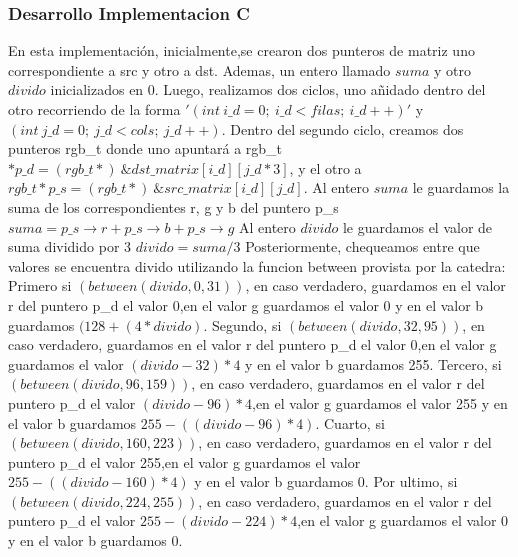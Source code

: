 \vspace*{0.3cm} \noindent
\subsubsection{Desarrollo Implementacion C}

En esta implementación, inicialmente,se crearon dos punteros de matriz uno correspondiente a src y otro a dst.\newline 
Ademas, un entero llamado $suma$ y otro $divido$ inicializados en 0. \newline
Luego, realizamos dos ciclos, uno añidado dentro del otro recorriendo de la forma $'(int\ i\_d = 0;\ i\_d < filas;\ i\_d++)'$ y 
$(int\ j\_d = 0;\ j\_d < cols;\ j\_d++)$.\newline
Dentro del segundo ciclo, creamos dos punteros rgb\_t donde uno apuntará a \newline rgb\_t $*p\_d = (rgb\_t*)\  \&dst\_matrix[i\_d][j\_d*3]$, y el otro
a $rgb\_t *p\_s = (rgb\_t*)\ \&src\_matrix[i\_d][j\_d]$.\newline
Al entero $suma$ le guardamos la suma de los correspondientes r, g y b del puntero p\_s $suma = p\_s\rightarrow r + p\_s\rightarrow b + p\_s\rightarrow g$
Al entero $divido$ le guardamos el valor de suma dividido por 3 $ divido = suma/3$
Posteriormente, chequeamos entre que valores se encuentra divido utilizando la funcion between provista por la catedra:\vspace*{0.3cm} \noindent\newline 
Primero si $(between(divido,0,31))$, en caso verdadero, guardamos en el valor r del puntero p\_d el valor 0,en el valor g 
guardamos el valor 0 y en el valor b guardamos $(128+ (4*divido)$. \newline 
Segundo, si $(between(divido,32,95))$, en caso verdadero, guardamos en el valor r del puntero p\_d el valor 0,en el valor g 
guardamos el valor $(divido-32)*4$ y en el valor b guardamos 255. \newline Tercero, si $(between(divido,96,159))$, en caso verdadero, guardamos en el valor r del puntero p\_d el valor $(divido-96)*4$,en el valor g 
guardamos el valor 255 y en el valor b guardamos $255-((divido-96)*4)$. \newline Cuarto, si $(between(divido,160,223))$, en caso verdadero, guardamos en el valor r del puntero p\_d el valor 255,en el valor g 
guardamos el valor $255 - ((divido-160)*4)$ y en el valor b guardamos 0. \newline  Por ultimo, si $(between(divido,224,255))$, en caso verdadero, guardamos en el valor r del puntero p\_d el valor $255-(divido-224)*4$,en el valor g 
guardamos el valor 0 y en el valor b guardamos 0. \newline 

